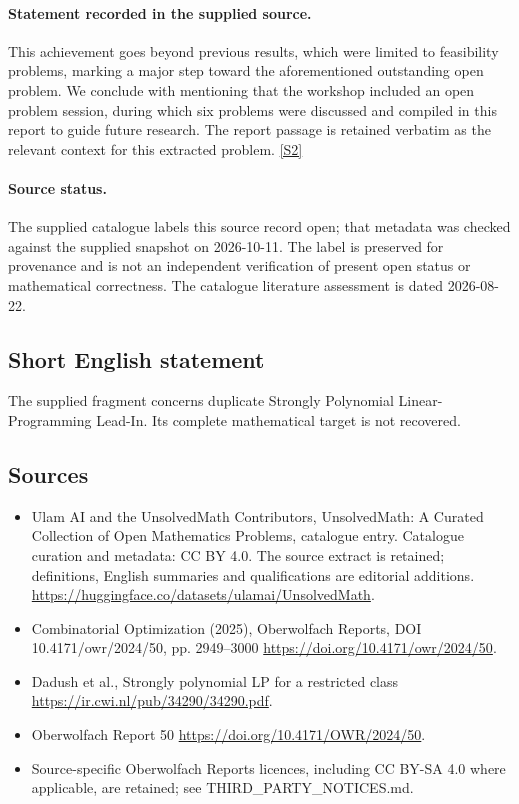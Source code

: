 \documentclass[11pt]{article}
\newcommand{\sref}[2]{\hyperlink{source:#1:#2}{[S#2]}}
\begin{document}
\paragraph{Statement recorded in the supplied source.}
This achievement goes beyond previous results, which were limited to feasibility problems, marking a major step toward the aforementioned outstanding open problem. We conclude with mentioning that the workshop included an open problem session, during which six problems were discussed and compiled in this report to guide future research. The report passage is retained verbatim as the relevant context for this extracted problem. \sref{statement}{2}
\paragraph{Source status.}
The supplied catalogue labels this source record open; that metadata was checked against the supplied snapshot on 2026-10-11. The label is preserved for provenance and is not an independent verification of present open status or mathematical correctness. The catalogue literature assessment is dated 2026-08-22.
\subsection{Short English statement}
The supplied fragment concerns duplicate Strongly Polynomial Linear-Programming Lead-In. Its complete mathematical target is not recovered.
\subsection{Sources}
\begin{itemize}
\item[\hypertarget{source:statement:1}{S1}] Ulam AI and the UnsolvedMath Contributors, UnsolvedMath: A Curated Collection of Open Mathematics Problems, catalogue entry. Catalogue curation and metadata: CC BY 4.0. The source extract is retained; definitions, English summaries and qualifications are editorial additions.
\url{https://huggingface.co/datasets/ulamai/UnsolvedMath}.
\item[\hypertarget{source:statement:2}{S2}] Combinatorial Optimization (2025), Oberwolfach Reports, DOI 10.4171/owr/2024/50, pp. 2949--3000
\url{https://doi.org/10.4171/owr/2024/50}.
\item[\hypertarget{source:statement:3}{S3}] Dadush et al., Strongly polynomial LP for a restricted class
\url{https://ir.cwi.nl/pub/34290/34290.pdf}.
\item[\hypertarget{source:statement:4}{S4}] Oberwolfach Report 50
\url{https://doi.org/10.4171/OWR/2024/50}.
\item Source-specific Oberwolfach Reports licences, including CC BY-SA 4.0 where applicable, are retained; see THIRD\_PARTY\_NOTICES.md.
\end{itemize}
\end{document}
